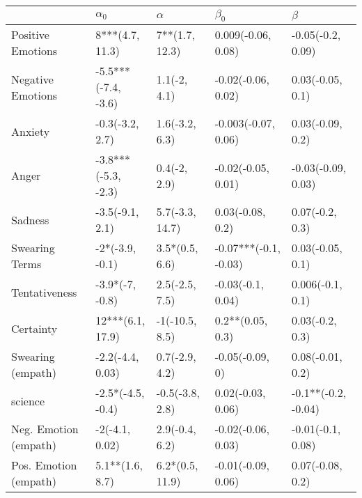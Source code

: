 \begin{tabular}{lllll}
\toprule
{} &           $\alpha_0$ &         $\alpha$ &              $\beta_0$ &              $\beta$ \\
\midrule
Positive Emotions     &      8***(4.7, 11.3) &   7**(1.7, 12.3) &     0.009(-0.06, 0.08) &    -0.05(-0.2, 0.09) \\
Negative Emotions     &  -5.5***(-7.4, -3.6) &     1.1(-2, 4.1) &     -0.02(-0.06, 0.02) &     0.03(-0.05, 0.1) \\
Anxiety               &      -0.3(-3.2, 2.7) &   1.6(-3.2, 6.3) &    -0.003(-0.07, 0.06) &     0.03(-0.09, 0.2) \\
Anger                 &  -3.8***(-5.3, -2.3) &     0.4(-2, 2.9) &     -0.02(-0.05, 0.01) &   -0.03(-0.09, 0.03) \\
Sadness               &      -3.5(-9.1, 2.1) &  5.7(-3.3, 14.7) &       0.03(-0.08, 0.2) &      0.07(-0.2, 0.3) \\
Swearing Terms        &      -2*(-3.9, -0.1) &   3.5*(0.5, 6.6) &  -0.07***(-0.1, -0.03) &     0.03(-0.05, 0.1) \\
Tentativeness         &      -3.9*(-7, -0.8) &   2.5(-2.5, 7.5) &      -0.03(-0.1, 0.04) &     0.006(-0.1, 0.1) \\
Certainty             &     12***(6.1, 17.9) &   -1(-10.5, 8.5) &       0.2**(0.05, 0.3) &      0.03(-0.2, 0.3) \\
Swearing (empath)     &     -2.2(-4.4, 0.03) &   0.7(-2.9, 4.2) &        -0.05(-0.09, 0) &     0.08(-0.01, 0.2) \\
science               &    -2.5*(-4.5, -0.4) &  -0.5(-3.8, 2.8) &      0.02(-0.03, 0.06) &  -0.1**(-0.2, -0.04) \\
Neg. Emotion (empath) &       -2(-4.1, 0.02) &   2.9(-0.4, 6.2) &     -0.02(-0.06, 0.03) &    -0.01(-0.1, 0.08) \\
Pos. Emotion (empath) &      5.1**(1.6, 8.7) &  6.2*(0.5, 11.9) &     -0.01(-0.09, 0.06) &     0.07(-0.08, 0.2) \\
\bottomrule
\end{tabular}
